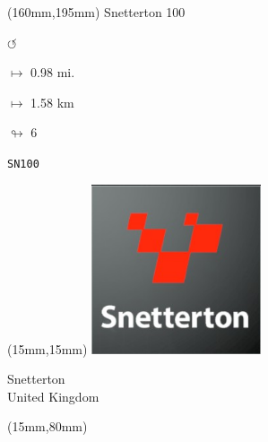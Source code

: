 \begin{textblock*}{40mm}(160mm,195mm)%
Snetterton 100
\par \Huge$\circlearrowleft$
\Large
\par$\mapsto$ 0.98 mi.
\par$\mapsto$ 1.58 km
\par$\looparrowright$ 6
\par\hfill\tiny\tt SN100\\
\end{textblock*}
\null\newpage

\begin{textblock*}{50mm}(15mm,15mm)%
\includegraphics[width=50mm]{LG/2015-05-20_00095.png}
\par Snetterton\\ United Kingdom
\end{textblock*}
\begin{textblock*}{185mm}(15mm,80mm)%
\end{textblock*}

